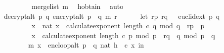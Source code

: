 \begin{isabellebody}
\ \ \ \ \ \ \ \ \ merge{\isacharunderscore}{\kern0pt}list\ m{\isacharparenright}{\kern0pt}{\isachardoublequoteclose}\ \isamarkupfalse%
\ h{\isacharunderscore}{\kern0pt}obtain\ \isamarkupfalse%
\ auto\isanewline
\isanewline
\ \ \isanewline
\ \ \isamarkupfalse%
\ \isamarkupfalse%
\ {\isachardoublequoteopen}decrypt{\isacharunderscore}{\kern0pt}alt\ p\ q\ {\isacharparenleft}{\kern0pt}encrypt{\isacharunderscore}{\kern0pt}alt\ {\isacharparenleft}{\kern0pt}p\ {\isacharasterisk}{\kern0pt}\ q{\isacharparenright}{\kern0pt}\ m\ r{\isacharparenright}{\kern0pt}\ {\isacharequal}{\kern0pt}\ \isanewline
\ \ \ \ {\isacharparenleft}{\kern0pt}let\ {\isacharparenleft}{\kern0pt}{\isacharparenleft}{\kern0pt}r{\isacharunderscore}{\kern0pt}p{\isacharcomma}{\kern0pt}\ r{\isacharunderscore}{\kern0pt}q{\isacharparenright}{\kern0pt}{\isacharcomma}{\kern0pt}\ {\isacharunderscore}{\kern0pt}{\isacharparenright}{\kern0pt}\ {\isacharequal}{\kern0pt}\ euclid{\isacharunderscore}{\kern0pt}ext\ p\ q{\isacharsemicolon}{\kern0pt}\ \isanewline
\ \ \ \ \ \ \ \ \ x{\isacharunderscore}{\kern0pt}{}\ {\isacharequal}{\kern0pt}\ nat\ {\isacharparenleft}{\kern0pt}{\isacharparenleft}{\kern0pt}{\isacharparenleft}{\kern0pt}x\ {\isacharcircum}{\kern0pt}\ {\isacharparenleft}{\kern0pt}calculate{\isacharunderscore}{\kern0pt}exponent\ {\isacharparenleft}{\kern0pt}length\ c{\isacharparenright}{\kern0pt}\ q{\isacharparenright}{\kern0pt}\ mod\ q{\isacharparenright}{\kern0pt}\ {\isacharasterisk}{\kern0pt}\ r{\isacharunderscore}{\kern0pt}p\ {\isacharasterisk}{\kern0pt}\ p\ \isanewline
\ \ \ \ \ \ \ \ {\isacharplus}{\kern0pt}\ {\isacharparenleft}{\kern0pt}x\ {\isacharcircum}{\kern0pt}\ {\isacharparenleft}{\kern0pt}calculate{\isacharunderscore}{\kern0pt}exponent\ {\isacharparenleft}{\kern0pt}length\ c{\isacharparenright}{\kern0pt}\ p{\isacharparenright}{\kern0pt}\ mod\ p{\isacharparenright}{\kern0pt}\ {\isacharasterisk}{\kern0pt}\ r{\isacharunderscore}{\kern0pt}q\ {\isacharasterisk}{\kern0pt}\ q{\isacharparenright}{\kern0pt}\ mod\ {\isacharparenleft}{\kern0pt}p\ {\isacharasterisk}{\kern0pt}\ q{\isacharparenright}{\kern0pt}{\isacharparenright}{\kern0pt}{\isacharsemicolon}{\kern0pt}\isanewline
\ \ \ \ \ \ \ \ {\isacharparenleft}{\kern0pt}m{\isacharcomma}{\kern0pt}\ x{\isacharprime}{\kern0pt}{\isacharparenright}{\kern0pt}\ {\isacharequal}{\kern0pt}\ enc{\isacharunderscore}{\kern0pt}loop{\isacharunderscore}{\kern0pt}alt\ {\isacharparenleft}{\kern0pt}p\ {\isacharasterisk}{\kern0pt}\ q{\isacharcomma}{\kern0pt}\ {\isacharparenleft}{\kern0pt}nat\ h{\isacharparenright}{\kern0pt}\ {\isacharcomma}{\kern0pt}\ c{\isacharparenright}{\kern0pt}\ x{\isacharunderscore}{\kern0pt}{}\ in\isanewline

\end{isabellebody}
